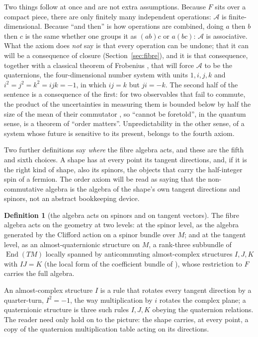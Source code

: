\documentclass[11pt,a4paper]{article}
\theoremstyle{plain}
\theoremstyle{definition}
\newtheorem{definition}[theorem]{Definition}
\theoremstyle{remark}
\begin{document}
Two things follow at once and are not extra assumptions. Because $F$ sits over a compact piece, there are only finitely many independent operations: $\mathcal{A}$ is finite-dimensional. Because ``and then'' is how operations are combined, doing $a$ then $b$ then $c$ is the same whether one groups it as $(ab)c$ or $a(bc)$: $\mathcal{A}$ is associative. What the axiom does \emph{not} say is that every operation can be undone; that it can will be a consequence of closure (Section~\ref{sec:fibre}), and it is that consequence, together with a classical theorem of Frobenius \cite{Frobenius1878}, that will force $\mathcal{A}$ to be the quaternions, the four-dimensional number system with units $1,i,j,k$ and $i^{2}=j^{2}=k^{2}=ijk=-1$, in which $ij=k$ but $ji=-k$. The second half of the sentence is a consequence of the first: for two observables that fail to commute, the product of the uncertainties in measuring them is bounded below by half the size of the mean of their commutator \cite{Robertson1929}, so ``cannot be foretold'', in the quantum sense, is a theorem of ``order matters''. Unpredictability in the other sense, of a system whose future is sensitive to its present, belongs to the fourth axiom.

Two further definitions say \emph{where} the fibre algebra acts, and these are the fifth and sixth choices. A shape has at every point its tangent directions, and, if it is the right kind of shape, also its spinors, the objects that carry the half-integer spin of a fermion. The order axiom will be read as saying that the non-commutative algebra is the algebra of the shape's own tangent directions and spinors, not an abstract bookkeeping device.

\begin{definition}[the algebra acts on spinors and on tangent vectors]\label{def:levels}
The fibre algebra acts on the geometry at two levels: at the spinor level, as the algebra generated by the Clifford action on a spinor bundle over $M$; and at the tangent level, as an almost-quaternionic structure on $M$, a rank-three subbundle of $\operatorname{End}(TM)$ locally spanned by anticommuting almost-complex structures $I,J,K$ with $IJ=K$ (the local form of the coefficient bundle of \cite{Salamon1982}), whose restriction to $F$ carries the full algebra.
\end{definition}

An almost-complex structure $I$ is a rule that rotates every tangent direction by a quarter-turn, $I^{2}=-1$, the way multiplication by $i$ rotates the complex plane; a quaternionic structure is three such rules $I,J,K$ obeying the quaternion relations. The reader need only hold on to the picture: the shape carries, at every point, a copy of the quaternion multiplication table acting on its directions.
\end{document}
